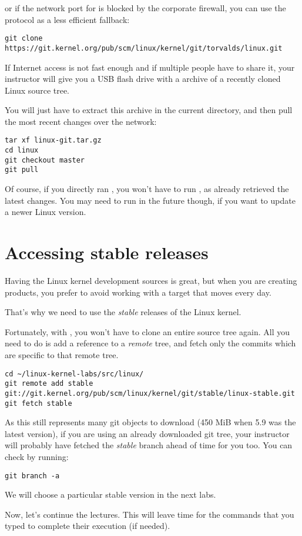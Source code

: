 or if the network port for  is blocked by the corporate
firewall, you can use the  protocol as a less efficient
fallback:

{\small
\begin{verbatim}
git clone https://git.kernel.org/pub/scm/linux/kernel/git/torvalds/linux.git
\end{verbatim}
}

If Internet access is not fast enough and if multiple people have to
share it, your instructor will give you a USB flash drive with a
 archive of a recently cloned Linux source tree.

You will just have to extract this archive in the current directory,
and then pull the most recent changes over the network:

\begin{verbatim}
tar xf linux-git.tar.gz
cd linux
git checkout master
git pull
\end{verbatim}

Of course, if you directly ran
, you won't have to run , as
 already retrieved the latest changes. You may need to
run  in the future though, if you want to update a
newer Linux version.

\section{Accessing stable releases}

Having the Linux kernel development sources is great, but when you are
creating products, you prefer to avoid working with a target that moves
every day.

That's why we need to use the {\em stable} releases of the Linux
kernel.

Fortunately, with , you won't have to clone an entire source
tree again. All you need to do is add a reference to a {\em remote}
tree, and fetch only the commits which are specific to that remote tree.

{\footnotesize
\begin{verbatim}
cd ~/linux-kernel-labs/src/linux/
git remote add stable git://git.kernel.org/pub/scm/linux/kernel/git/stable/linux-stable.git
git fetch stable
\end{verbatim}
}

As this still represents many git objects to download (450 MiB when 5.9 was
the latest version), if you are using an already downloaded git tree,
your instructor will probably have fetched the {\em stable} branch ahead
of time for you too. You can check by running:

\begin{verbatim}
git branch -a
\end{verbatim}

We will choose a particular stable version in the next labs.

Now, let's continue the lectures. This will leave time for the commands
that you typed to complete their execution (if needed).
